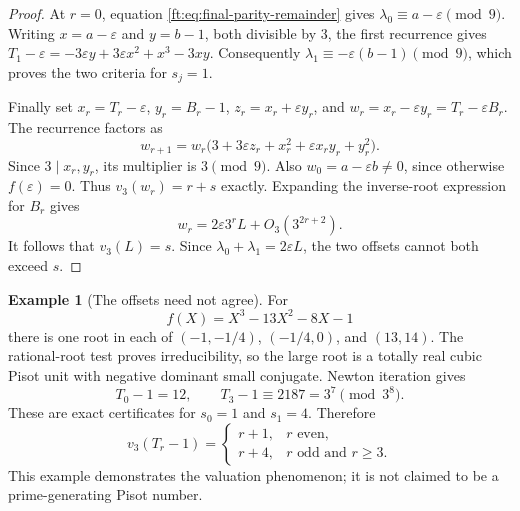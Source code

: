 \documentclass[11pt,a4paper]{article}
\theoremstyle{definition}
\newtheorem{example}[theorem]{Example}
\theoremstyle{remark}
\numberwithin{equation}{section}
\begin{document}
\begin{proof}
At $r=0$, equation \eqref{ft:eq:final-parity-remainder} gives
$\lambda_0\equiv a-\varepsilon\pmod9$.
Writing $x=a-\varepsilon$ and $y=b-1$, both divisible by $3$,
the first recurrence gives
$T_1-\varepsilon=-3\varepsilon y+3\varepsilon x^2+x^3-3xy$.
Consequently $\lambda_1\equiv-\varepsilon(b-1)\pmod9$,
which proves the two criteria for $s_j=1$.

Finally set $x_r=T_r-\varepsilon$, $y_r=B_r-1$,
$z_r=x_r+\varepsilon y_r$, and
$w_r=x_r-\varepsilon y_r=T_r-\varepsilon B_r$.
The recurrence factors as
\[
 w_{r+1}=w_r
 \bigl(3+3\varepsilon z_r+x_r^2+\varepsilon x_ry_r+y_r^2\bigr).
\]
Since $3\mid x_r,y_r$, its multiplier is $3\pmod9$.
Also $w_0=a-\varepsilon b\ne0$, since otherwise
$f(\varepsilon)=0$. Thus $v_3(w_r)=r+s$ exactly.
Expanding the inverse-root expression for $B_r$ gives
\[
 w_r=2\varepsilon3^r L+O_3(3^{2r+2}).
\]
It follows that $v_3(L)=s$. Since
$\lambda_0+\lambda_1=2\varepsilon L$, the two offsets cannot
both exceed $s$.
\end{proof}

\begin{example}[The offsets need not agree]
For
\[
 f(X)=X^3-13X^2-8X-1
\]
there is one root in each of $(-1,-1/4)$, $(-1/4,0)$, and
$(13,14)$. The rational-root test proves irreducibility, so the
large root is a totally real cubic Pisot unit with negative
dominant small conjugate. Newton iteration gives
\[
 T_0-1=12,\qquad T_3-1\equiv2187=3^7\pmod{3^8}.
\]
These are exact certificates for $s_0=1$ and $s_1=4$.
Therefore
\[
 v_3(T_r-1)=
 \begin{cases}
 r+1,&r\text{ even},\\
 r+4,&r\text{ odd and }r\ge3.
 \end{cases}
\]
This example demonstrates the valuation phenomenon; it is not
claimed to be a prime-generating Pisot number.
\end{example}
\end{document}
